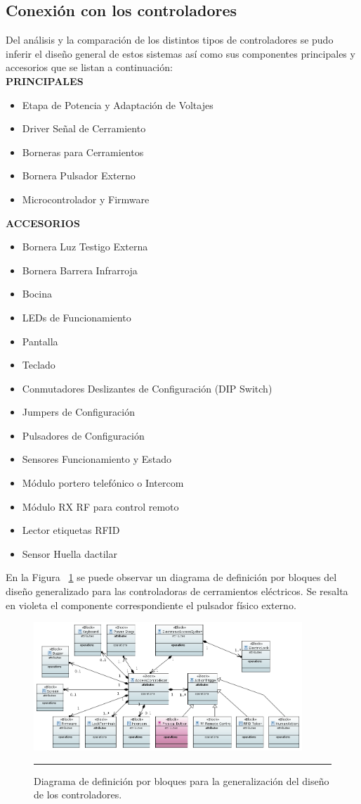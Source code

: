 \subsection{Conexión con los controladores}
Del análisis y la comparación de los distintos tipos de controladores se pudo inferir el diseño general de estos sistemas así como sus componentes principales y accesorios que se listan a continuación:\\
\textbf{PRINCIPALES}
\begin{itemize}
	\item Etapa de Potencia y Adaptación de Voltajes 
	\item Driver Señal de Cerramiento
	\item Borneras para Cerramientos
	\item Bornera Pulsador Externo
	\item Microcontrolador y Firmware
\end{itemize}
\textbf{ACCESORIOS}
\begin{itemize}
	\item Bornera Luz Testigo Externa
	\item Bornera Barrera Infrarroja
	\item Bocina
	\item LEDs de Funcionamiento
	\item Pantalla
	\item Teclado
	\item Conmutadores Deslizantes de Configuración (DIP Switch)
	\item Jumpers de Configuración
	\item Pulsadores de Configuración
	\item Sensores Funcionamiento y Estado
	\item Módulo portero telefónico o Intercom
	\item Módulo RX RF para control remoto
	\item Lector etiquetas RFID
	\item Sensor Huella dactilar
\end{itemize}
En la Figura ~\ref{fig:controller_bdd} se puede observar un diagrama de definición por bloques del diseño generalizado para las controladoras de cerramientos eléctricos. Se resalta en violeta el componente correspondiente el pulsador físico externo.\\
\begin{figure}[htbp]
	\centering
	\includegraphics[width=0.9\textwidth]{Pictures/controller_bdd.png}
	\rule{35em}{1pt}
	\caption[Diagrama Bloques Controlador]{Diagrama de definición por bloques para la generalización del diseño de los controladores.}
	\label{fig:controller_bdd}
\end{figure}

